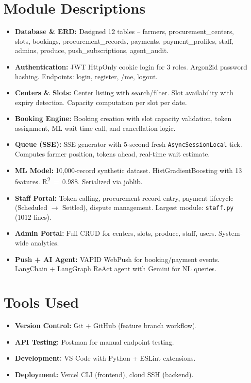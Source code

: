 \section{Module Descriptions}
\begin{itemize}
  \item \textbf{Database \& ERD:} Designed 12 tables -- farmers, procurement\_centers, slots, bookings, procurement\_records, payments, payment\_profiles, staff, admins, produce, push\_subscriptions, agent\_audit.
  \item \textbf{Authentication:} JWT HttpOnly cookie login for 3 roles. Argon2id password hashing. Endpoints: login, register, /me, logout.
  \item \textbf{Centers \& Slots:} Center listing with search/filter. Slot availability with expiry detection. Capacity computation per slot per date.
  \item \textbf{Booking Engine:} Booking creation with slot capacity validation, token assignment, ML wait time call, and cancellation logic.
  \item \textbf{Queue (SSE):} SSE generator with 5-second fresh \texttt{AsyncSessionLocal} tick. Computes farmer position, tokens ahead, real-time wait estimate.
  \item \textbf{ML Model:} 10,000-record synthetic dataset. HistGradientBoosting with 13 features. R\textsuperscript{2}~=~0.988. Serialized via joblib.
  \item \textbf{Staff Portal:} Token calling, procurement record entry, payment lifecycle (Scheduled $\to$ Settled), dispute management. Largest module: \texttt{staff.py} (1012 lines).
  \item \textbf{Admin Portal:} Full CRUD for centers, slots, produce, staff, users. System-wide analytics.
  \item \textbf{Push + AI Agent:} VAPID WebPush for booking/payment events. LangChain + LangGraph ReAct agent with Gemini for NL queries.
\end{itemize}

\section{Tools Used}
\begin{itemize}
  \item \textbf{Version Control:} Git + GitHub (feature branch workflow).
  \item \textbf{API Testing:} Postman for manual endpoint testing.
  \item \textbf{Development:} VS Code with Python + ESLint extensions.
  \item \textbf{Deployment:} Vercel CLI (frontend), cloud SSH (backend).
\end{itemize}
